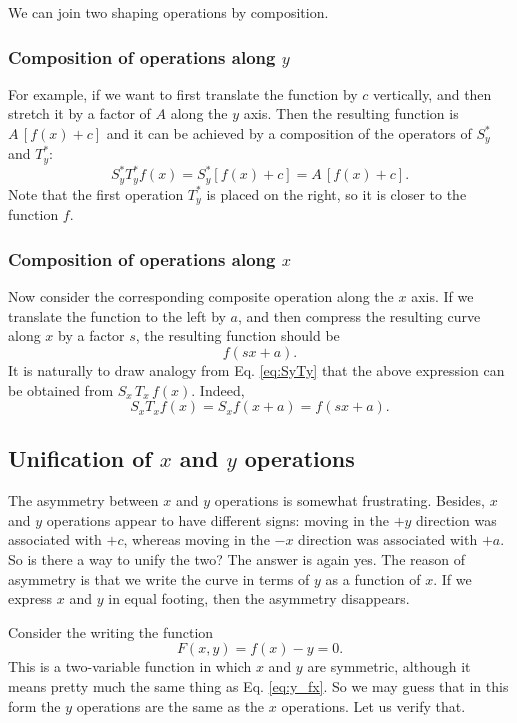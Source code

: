 \documentclass{article}
\begin{document}
We can join two shaping operations by composition.


\subsubsection{Composition of operations along $y$}

For example, if we want to first translate the function by $c$ vertically,
and then stretch it by a factor of $A$ along the $y$ axis.
Then the resulting function is $A \, [f(x) + c]$
and it can be achieved by a composition of the operators
of $S_y^*$ and $T_y^*$:
\begin{equation}
S_y^* T_y^* f(x) = S_y^* [f(x) + c] = A \, [f(x) + c].
\label{eq:SyTy}
\end{equation}
Note that the first operation $T_y^*$ is placed on the right,
so it is closer to the function $f$.


\subsubsection{Composition of operations along $x$}

Now consider the corresponding composite operation along the $x$ axis.
%
If we translate the function to the left by $a$,
and then compress the resulting curve along $x$
by a factor $s$,
the resulting function should be
$$
  f(sx+a).
$$
%
It is naturally to draw analogy from Eq. \eqref{eq:SyTy} that
the above expression can be obtained from $S_x \, T_x \, f(x)$.
Indeed,
$$
S_x T_x f(x) = S_x f(x + a) = f(s x + a).
$$

\subsection{Unification of $x$ and $y$ operations}

The asymmetry between $x$ and $y$ operations
is somewhat frustrating.
%
Besides, $x$ and $y$
operations appear to have different signs:
moving in the $+y$ direction was associated with $+c$,
whereas moving in the $-x$ direction was associated with $+a$.
So is there a way to unify the two?
The answer is again yes.
The reason of asymmetry is that
we write the curve in terms of $y$ as a function of $x$.
%
If we express $x$ and $y$ in equal footing,
then the asymmetry disappears.

Consider the writing the function
$$
F(x, y) = f(x) - y = 0.
$$
This is a two-variable function
in which $x$ and $y$ are symmetric,
although it means pretty much the same thing as
Eq. \eqref{eq:y_fx}.
So we may guess that in this form
the $y$ operations are the same as the $x$ operations.
Let us verify that.
\end{document}
